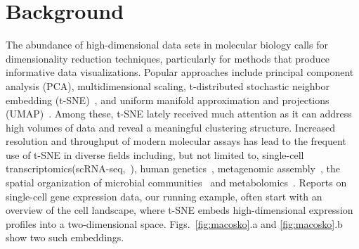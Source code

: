 \documentclass[twocolumn]{bmcart}
\begin{document}
\section*{Background}

The abundance of high-dimensional data sets in molecular biology calls for
dimensionality reduction techniques, particularly for methods that produce
informative data visualizations. Popular approaches include principal component
analysis (PCA), multidimensional scaling, t-distributed stochastic neighbor
embedding (t-SNE)~\cite{maaten2008visualizing}, and uniform manifold
approximation and projections (UMAP)~\cite{2018arXivUMAP}. Among these, t-SNE
lately received much attention as it can address high volumes of data and reveal
a meaningful clustering structure. Increased resolution and throughput of modern
molecular assays has lead to the frequent use of t-SNE in diverse fields
including, but not limited to, single-cell
transcriptomics(scRNA-seq,~\cite{macosko2015highly,cao2019single,tasic2018shared}),
human genetics~\cite{hirata2019genetic}, metagenomic
assembly~\cite{beaulaurier2018metagenomic}, the spatial organization of
microbial communities~\cite{sheth2019spatial} and
metabolomics~\cite{tkachev2019differences}. Reports on single-cell gene
expression data, our running example, often start with an overview of the cell
landscape, where t-SNE embeds high-dimensional expression profiles into a
two-dimensional space. Figs.~\ref{fig:macosko}.a and \ref{fig:macosko}.b show
two such embeddings.
\end{document}
